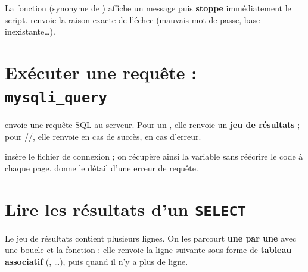 \begin{remarque}
La fonction  (synonyme de ) affiche un message puis
\textbf{stoppe} immédiatement le script.  renvoie
la raison exacte de l'échec (mauvais mot de passe, base inexistante\dots).
\end{remarque}

\section{Exécuter une requête : \texttt{mysqli\_query}}

\begin{definition}
 envoie une requête SQL au serveur. Pour un
, elle renvoie un \textbf{jeu de résultats} ; pour
//, elle renvoie  en cas de
succès,  en cas d'erreur.
\end{definition}


\begin{remarque}
 insère le fichier de connexion ; on récupère
ainsi la variable  sans réécrire le code à chaque page.
 donne le détail d'une erreur de requête.
\end{remarque}

\section{Lire les résultats d'un \texttt{SELECT}}

Le jeu de résultats contient plusieurs lignes. On les parcourt \textbf{une par
une} avec une boucle  et la fonction  :
elle renvoie la ligne suivante sous forme de \textbf{tableau associatif}
(, \dots), puis 
quand il n'y a plus de ligne.

\begin{syntaxe}
\end{syntaxe}

